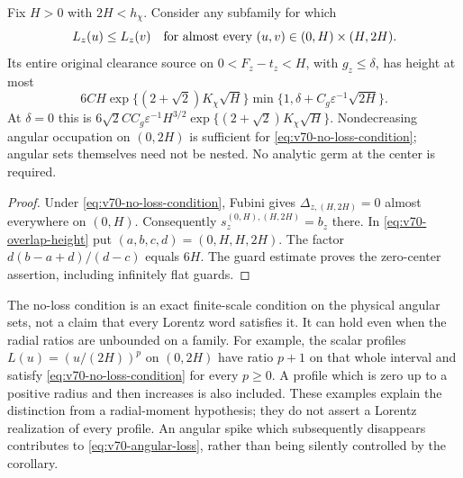 \begin{corollary}
\label{cor:v70-no-loss-height}
Fix $H>0$ with $2H<h_\chi$. Consider any subfamily for which
\begin{equation}\label{eq:v70-no-loss-condition}
 L_z(u)\le L_z(v)\quad\hbox{for almost every }
                    (u,v)\in(0,H)\mathbin{\times}(H,2H).
\end{equation}
Its entire original clearance source on $0<F_z-t_z<H$, with
$g_z\le\delta$, has height at most
\begin{equation}\label{eq:v70-no-loss-height}
 6CH\exp\{(2+\sqrt2)K_\chi\sqrt H\}
            \min\{1,\delta+C_g\varepsilon^{-1}\sqrt{2H}\}.
\end{equation}
At $\delta=0$ this is
$6\sqrt2 CC_g\varepsilon^{-1}H^{3/2}
 \exp\{(2+\sqrt2)K_\chi\sqrt H\}$.
Nondecreasing angular occupation on $(0,2H)$ is sufficient for
\eqref{eq:v70-no-loss-condition}; angular sets themselves need not
be nested. No analytic germ at the center is required.
\end{corollary}
\begin{proof}
Under \eqref{eq:v70-no-loss-condition}, Fubini gives
$\Delta_{z,(H,2H)}=0$ almost everywhere on $(0,H)$. Consequently
$s_z^{(0,H),(H,2H)}=b_z$ there. In
\eqref{eq:v70-overlap-height} put $(a,b,c,d)=(0,H,H,2H)$.
The factor $d(b-a+d)/(d-c)$ equals $6H$. The guard estimate
proves the zero-center assertion, including infinitely flat guards.
\end{proof}

The no-loss condition is an exact finite-scale condition on the
physical angular sets, not a claim that every Lorentz word satisfies
it. It can hold even when the radial ratios are unbounded on a
family. For example, the scalar profiles $L(u)=(u/(2H))^p$ on
$(0,2H)$ have ratio $p+1$ on that whole interval and satisfy
\eqref{eq:v70-no-loss-condition} for every $p\ge0$. A profile
which is zero up to a positive radius and then increases is also
included. These examples explain the distinction from a radial-moment
hypothesis; they do not assert a Lorentz realization of every profile.
An angular spike which subsequently disappears contributes to
\eqref{eq:v70-angular-loss}, rather than being silently controlled
by the corollary.
